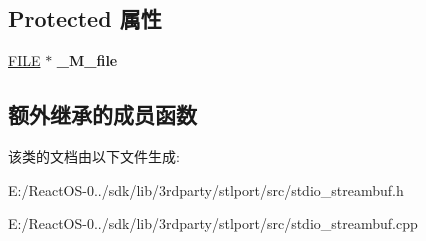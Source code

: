 \subsection*{Protected 属性}
\begin{DoxyCompactItemize}
\item 
\mbox{\label{classstdio__streambuf__base_ae10511bf1aab35bbb1892a61a1bff532}} 
\hyperlink{struct__iobuf}{F\+I\+LE} $\ast$ {\bfseries \+\_\+\+M\+\_\+file}
\end{DoxyCompactItemize}
\subsection*{额外继承的成员函数}


该类的文档由以下文件生成\+:\begin{DoxyCompactItemize}
\item 
E\+:/\+React\+O\+S-\/0../sdk/lib/3rdparty/stlport/src/stdio\+\_\+streambuf.\+h\item 
E\+:/\+React\+O\+S-\/0../sdk/lib/3rdparty/stlport/src/stdio\+\_\+streambuf.\+cpp\end{DoxyCompactItemize}
